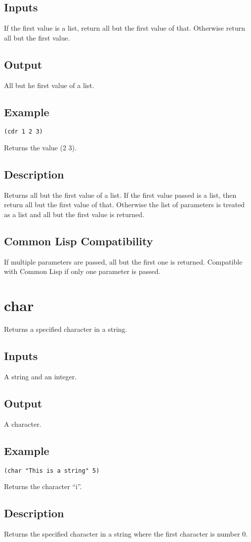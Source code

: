 \documentclass[10pt, openany]{book}
\newcommand{\cl}{Common Lisp}
\begin{document}
\subsection{Inputs}
If the first value is a list, return all but the first value of that.  Otherwise return all but the first value.
\subsection{Output}
All but he first value of a list.
\subsection{Example}
\begin{lstlisting}
(cdr 1 2 3)
\end{lstlisting}
Returns the value (2 3).
\subsection{Description}
Returns all but the first value of a list.  If the first value passed is a list, then return all but the first value of that.  Otherwise the list of parameters is treated as a list and all but the first value is returned.
\subsection{Common Lisp Compatibility}
If multiple parameters are passed, all but the first one is returned.  Compatible with \cl{} if only one parameter is passed.

\section{char}
Returns a specified character in a string.
\subsection{Inputs}
A string and an integer.
\subsection{Output}
A character.
\subsection{Example}
\begin{lstlisting}
(char "This is a string" 5)
\end{lstlisting}
Returns the character ``i''.
\subsection{Description}
Returns the specified character in a string where the first character is number 0.
\end{document}
